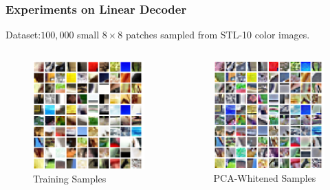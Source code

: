 \documentclass{beamer}
\begin{document}
\begin{CJK*}{UTF8}{gbsn}
\begin{frame}\frametitle{Experiments on Linear Decoder}
Dataset:$100,000$ small $8\times 8$ patches sampled from STL-10 color images.
\begin{columns}
\begin{column}{0.5\linewidth}
\begin{figure}
\centering
\includegraphics[scale=0.18]{images/STL10_Samples}
\caption{Training Samples}
\end{figure}
\end{column}
\begin{column}{0.5\linewidth}
\begin{figure}
\centering
\includegraphics[scale=0.18]{images/STL10_PCAWhiten}
\caption{PCA-Whitened Samples}
\end{figure}
\end{column}
\end{columns}
\begin{figure}
\centering

\end{figure}
\end{frame}
\end{CJK*}
\end{document}
